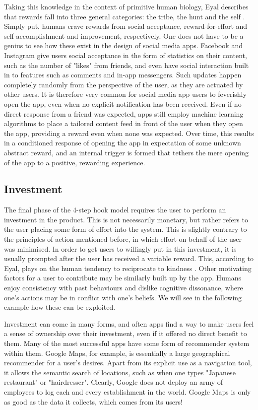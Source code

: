 Taking this knowledge in the context of primitive human biology, Eyal describes that rewards fall into three general categories: the tribe, the hunt and the self \cite{eyal2014hooked}. Simply put, humans crave rewards from social acceptance, reward-for-effort and self-accomplishment and improvement, respectively. One does not have to be a genius to see how these exist in the design of social media apps. Facebook and Instagram give users social acceptance in the form of statistics on their content, such as the number of "likes" from friends, and even have social interaction built in to features such as comments and in-app messengers. Such updates happen completely randomly from the perspective of the user, as they are actuated by other users. It is therefore very common for social media app users to feverishly open the app, even when no explicit notification has been received. Even if no direct response from a friend was expected, apps still employ machine learning algorithms to place a tailored content feed in front of the user when they open the app, providing a reward even when none was expected. Over time, this results in a conditioned response of opening the app in expectation of some unknown abstract reward, and an internal trigger is formed that tethers the mere opening of the app to a positive, rewarding experience.

\subsection{Investment}
The final phase of the 4-step hook model requires the user to perform an investment in the product. This is not necessarily monetary, but rather refers to the user placing some form of effort into the system. This is slightly contrary to the principles of action mentioned before, in which effort on behalf of the user was minimised. In order to get users to willingly put in this investment, it is usually prompted after the user has received a variable reward. This, according to Eyal, plays on the human tendency to reciprocate to kindness \cite{eyal2014hooked}. Other motivating factors for a user to contribute may be similarly built up by the app. Humans enjoy consistency with past behaviours and dislike cognitive dissonance, where one's actions may be in conflict with one's beliefs. We will see in the following example how these can be exploited.

Investment can come in many forms, and often apps find a way to make users feel a sense of ownership over their investment, even if it offered no direct benefit to them. Many of the most successful apps have some form of recommender system within them. Google Maps, for example, is essentially a large geographical recommender for a user's desires. Apart from its explicit use as a navigation tool, it allows the semantic search of locations, such as when one types "Japanese restaurant" or "hairdresser". Clearly, Google does not deploy an army of employees to log each and every establishment in the world. Google Maps is only as good as the data it collects, which comes from its users!

